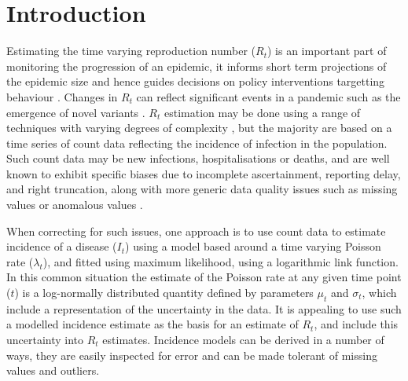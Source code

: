 \documentclass[10pt,letterpaper]{article}
\begin{document}
%

\linenumbers

\section*{Introduction}

Estimating the time varying reproduction number ($R_t$) is an important part of monitoring the progression of an epidemic, it informs short term projections of the epidemic size and hence guides decisions on policy interventions targetting behaviour \cite{gostic2020}. Changes in $R_t$ can reflect significant events in a pandemic such as the emergence of novel variants \cite{davies2021}. $R_t$ estimation may be done using a range of techniques with varying degrees of complexity \cite{abbott2024,alvarez2021,parag2021,thompson2019,wallinga2006,steyn2024,nash2023,nash2022,cauchemez2006,hong2020,johnson2021,ogi-gittins2024}, but the majority are based on a time series of count data reflecting the incidence of infection in the population. Such count data may be new infections, hospitalisations or deaths, and are well known to exhibit specific biases due to incomplete ascertainment, reporting delay, and right truncation, along with more generic data quality issues such as missing values or anomalous values \cite{abbott2020}.

When correcting for such issues, one approach is to use count data to estimate incidence of a disease ($I_t$) using a model based around a time varying Poisson rate ($\lambda_t$), and fitted using maximum likelihood, using a logarithmic link function. In this common situation the estimate of the Poisson rate at any given time point ($t$) is a log-normally distributed quantity defined by parameters $\mu_t$ and $\sigma_t$, which include a representation of the uncertainty in the data. It is appealing to use such a modelled incidence estimate as the basis for an estimate of $R_t$, and include this uncertainty into $R_t$ estimates. Incidence models can be derived in a number of ways, they are easily inspected for error and can be made tolerant of missing values and outliers.
\end{document}
